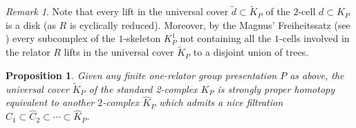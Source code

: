 \documentclass{amsart}[12pt]
\newtheorem{proposition}[theorem]{Proposition}
\theoremstyle{definition}
\theoremstyle{remark}
\newtheorem{remark}[theorem]{Remark}
\numberwithin{equation}{section}
\begin{document}
\begin{remark} \label{Magnus} Note that every lift in the universal cover $\tilde{d} {\subset}
\tilde{K}_P$ of the $2$-cell $d {\subset} K_P$ is a disk (as $R$ is
cyclically reduced). Moreover, by the Magnus' Freiheitssatz (see
\cite{LS,MKS}) every subcomplex of the $1$-skeleton $K^1_P$ not
containing all the $1$-cells involved in the relator $R$ lifts in
the universal cover $\tilde{K}_P$ to a disjoint union of trees.
\end{remark}
\begin{proposition} \label{prop} Given any finite one-relator group presentation
$P$ as above, the universal cover $\tilde{K}_P$ of the standard
2-complex $K_P$ is strongly proper homotopy equivalent to another
$2$-complex $\widehat{K}_P$ which admits a nice filtration
$\widehat{C}_1 {\subset} \widehat{C}_2 {\subset} \cdots {\subset} \widehat{K}_P$.
\end{proposition}
\end{document}
